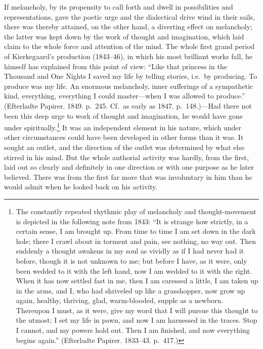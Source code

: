 \documentclass[12pt,a4paper]{book}
\newcommand{\opage}[1]{\marginnote{\footnotesize\textit{[#1]}}}
\begin{document}
If melancholy, by its propensity to call forth and dwell in possibilities
and representations, gave the poetic urge and the dialectical drive wind
in their sails, there was thereby attained, on the other hand, a
diverting effect on melancholy; the latter was kept down by the work of
thought and imagination, which laid claim to the whole force and
attention of the mind. The whole first grand period of
\opage{43}Kierkegaard's production (1843--46), in which his most brilliant
works fall, he himself has explained from this point of view: ``Like that
princess in the Thousand and One Nights I saved my life by telling
stories, i.e.\ by producing. To produce was my life. An enormous
melancholy, inner sufferings of a sympathetic kind, everything,
everything I could master---when I was allowed to produce.'' (Efterladte
Papirer. 1849. p.~245. Cf.\ as early as 1847. p.~148.)---Had there not
been this deep urge to work of thought and imagination,
he would have gone under spiritually.\footnote{The constantly repeated
rhythmic play of melancholy and thought-movement is depicted in the
following note from 1843: ``It is strange how strictly, in a certain
sense, I am brought up. From time to time I am set down in the dark hole;
there I crawl about in torment and pain, see nothing, no way out. Then
suddenly a thought awakens in my soul as vividly as if I had never had it
before, though it is not unknown to me; but before I have, as it were,
only been wedded to it with the left hand, now I am wedded to it with the
right. When it has now settled fast in me, then I am caressed a little, I
am taken up in the arms, and I, who had shriveled up like a grasshopper,
now grow up again, healthy, thriving, glad, warm-blooded, supple as a
newborn. Thereupon I must, as it were, give my word that I will pursue
this thought to the utmost; I set my life in pawn, and now I am harnessed
in the traces. Stop I cannot, and my powers hold out. Then I am finished,
and now everything begins again.'' (Efterladte Papirer. 1833--43.
p.~417.)} It was an independent element in his nature, which under other
circumstances could have been developed in other forms than it was. It
sought an outlet, and the direction of the outlet was determined by what
else stirred in his mind. But the whole authorial activity was hardly,
from the first, laid out so clearly and definitely in one direction or
with one purpose as he later believed. There was from the first far more
that was involuntary in him than he would admit when he looked back on
his activity.
\end{document}

